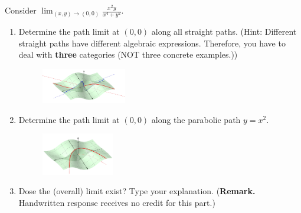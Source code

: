 \documentclass[10pt]{article}
\title{}
\date{}
\begin{document}
Consider $\displaystyle \lim_{(x,y)\to(0,0)}\frac{x^2y}{x^4+y^2}$.
\begin{enumerate}[label = (\alph*)]
\item Determine the path limit at $(0,0)$ along all straight paths. (Hint: Different straight paths have different algebraic expressions. Therefore, you have to deal with {\bf three} categories (NOT three concrete examples.))
\begin{figure}[h]
\begin{flushright}
\includegraphics[width=0.35\textwidth]{function4.png}
\end{flushright}
\end{figure}

\item Determine the path limit at $(0,0)$ along the parabolic path $y=x^2$.
\begin{figure}[h]
\begin{flushright}
\includegraphics[width=0.3\textwidth]{function5.png}
\end{flushright}
\end{figure}

\item Dose the (overall) limit exist? Type your explanation. ({\bf Remark.} Handwritten response receives no credit for this part.)
\end{enumerate}
\clearpage
\end{document}
